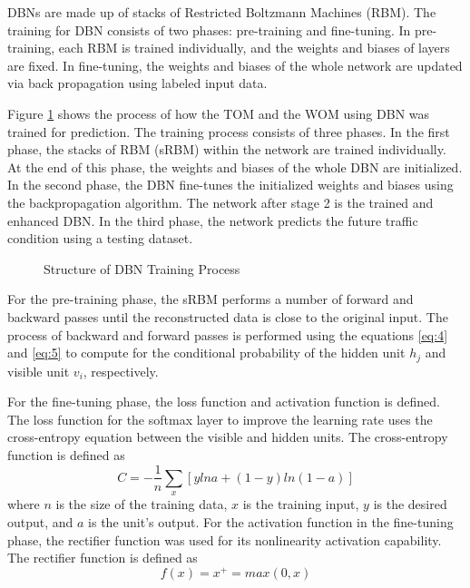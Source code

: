 
DBNs are made up of stacks of Restricted Boltzmann Machines (RBM). The training for DBN consists of two phases: pre-training and fine-tuning. In pre-training, each RBM is trained individually, and the weights and biases of layers are fixed. In fine-tuning, the weights and biases of the whole network are updated via back propagation using labeled input data.

Figure \ref{fig:dbntraining} shows the process of how the TOM and the WOM using DBN was trained for prediction. The training process consists of three phases. In the first phase, the stacks of RBM (sRBM) within the network are trained individually. At the end of this phase, the weights and biases of the whole DBN are initialized. In the second phase, the DBN fine-tunes the initialized weights and biases using the backpropagation algorithm. The network after stage 2 is the trained and enhanced DBN. In the third phase, the network predicts the future traffic condition using a testing dataset.

\begin{figure}[!t]
	\centering
	\captionsetup{justification=centering}
	\caption{Structure of DBN Training Process}
	\label{fig:dbntraining}
\end{figure}

For the pre-training phase, the sRBM performs a number of forward and backward passes until the reconstructed data is close to the original input. The process of backward and forward passes is performed using the equations \ref{eq:4} and \ref{eq:5} to compute for the conditional probability of the hidden unit $h_j$ and visible unit $v_i$, respectively.

For the fine-tuning phase, the loss function and activation function is defined.
The loss function for the softmax layer to improve the learning rate uses the cross-entropy equation between the visible and hidden units. The cross-entropy function is defined as
\begin{equation}
C = -\frac{1}{n}\sum_x [y ln a + (1 - y) ln (1-a)]
\end{equation}
\noindent where $n$ is the size of the training data, $x$ is the training input, $y$ is the desired output, and $a$ is the unit’s output.
For the activation function in the fine-tuning phase, the rectifier function was used for its nonlinearity activation capability. The rectifier function is defined as
\begin{equation}
f(x) = x^+ = max(0, x)
\end{equation}


